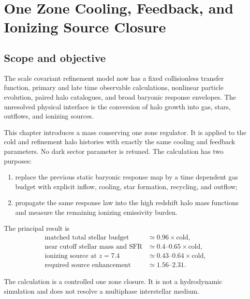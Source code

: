 \chapter[Cooling, Feedback, and Ionizing Sources]{One Zone Cooling, Feedback, and Ionizing Source Closure}
\label{ch:cooling-feedback-reionization}



\section{Scope and objective}

The scale covariant refinement model now has a fixed collisionless transfer function, primary and late time observable calculations, nonlinear particle evolution, paired halo catalogues, and broad baryonic response envelopes.  The unresolved physical interface is the conversion of halo growth into gas, stars, outflows, and ionizing sources.

This chapter introduces a mass conserving one zone regulator.  It is applied to the cold and refinement halo histories with exactly the same cooling and feedback parameters.  No dark sector parameter is retuned.  The calculation has two purposes:
\begin{enumerate}
\item replace the previous static baryonic response map by a time dependent gas budget with explicit inflow, cooling, star formation, recycling, and outflow;
\item propagate the same response law into the high redshift halo mass functions and measure the remaining ionizing emissivity burden.
\end{enumerate}

The principal result is
\begin{equation}
\boxed{
\begin{aligned}
\text{matched total stellar budget} &\simeq 0.96\times\text{cold},\\
\text{near cutoff stellar mass and SFR} &\simeq 0.4\text{--}0.65\times\text{cold},\\
\text{ionizing source at }z=7.4 &\simeq 0.43\text{--}0.64\times\text{cold},\\
\text{required source enhancement} &\simeq 1.56\text{--}2.31.
\end{aligned}}
\label{eq:cfr-principal-result}
\end{equation}

The calculation is a controlled one zone closure.  It is not a hydrodynamic simulation and does not resolve a multiphase interstellar medium.


